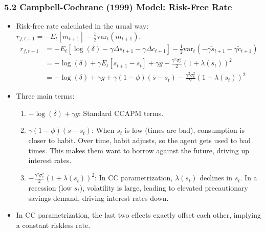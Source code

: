 \documentclass{beamer}
\begin{document}
\begin{frame}
    \frametitle{5.2 Campbell-Cochrane (1999) Model: Risk-Free Rate}
    \begin{itemize}
        \item Risk-free rate calculated in the usual way: $r_{f,t+1} = -E_t[m_{t+1}] - \frac{1}{2}\text{var}_t(m_{t+1})$.
        \begin{align*}
            r_{f,t+1} &= -E_t[\log(\delta) - \gamma\Delta s_{t+1} - \gamma\Delta c_{t+1}] - \frac{1}{2}\text{var}_t(-\gamma\tilde{s}_{t+1} - \gamma\tilde{c}_{t+1}) \\
            &= -\log(\delta) + \gamma E_t[s_{t+1} - s_t] + \gamma g - \frac{\gamma^2\sigma_c^2}{2} (1+\lambda(s_t))^2 \\
            &= -\log(\delta) + \gamma g + \gamma(1-\phi)(\bar{s} - s_t) - \frac{\gamma^2\sigma_c^2}{2} (1+\lambda(s_t))^2
        \end{align*}
        \item Three main terms:
        \begin{enumerate}
            \item $-\log(\delta) + \gamma g$: Standard CCAPM terms.
            \item $\gamma(1-\phi)(\bar{s} - s_t)$: When $s_t$ is low (times are bad), consumption is closer to habit. Over time, habit adjusts, so the agent gets used to bad times. This makes them want to borrow against the future, driving up interest rates.
            \item $-\frac{\gamma^2\sigma_c^2}{2} (1+\lambda(s_t))^2$: In CC parametrization, $\lambda(s_t)$ declines in $s_t$. In a recession (low $s_t$), volatility is large, leading to elevated precautionary savings demand, driving interest rates down.
        \end{enumerate}
        \item In CC parametrization, the last two effects exactly offset each other, implying a constant riskless rate.
    \end{itemize}
\end{frame}
\end{document}

